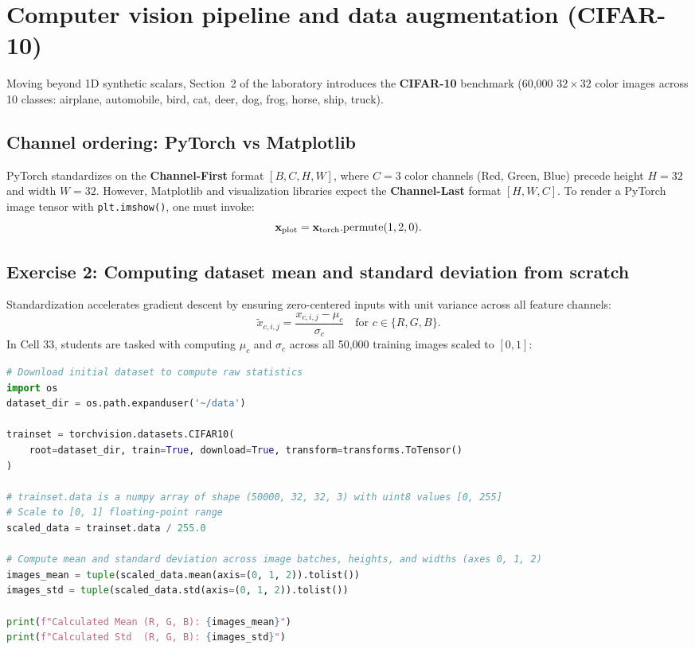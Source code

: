 \documentclass[../labs.tex]{subfiles}
\begin{document}
\section{Computer vision pipeline and data augmentation (CIFAR-10)}

Moving beyond 1D synthetic scalars, Section~2 of the laboratory introduces the \textbf{CIFAR-10} benchmark (60,000 $32 \times 32$ color images across 10 classes: airplane, automobile, bird, cat, deer, dog, frog, horse, ship, truck).

\subsection{Channel ordering: PyTorch vs Matplotlib}
PyTorch standardizes on the \textbf{Channel-First} format $[B, C, H, W]$, where $C = 3$ color channels (Red, Green, Blue) precede height $H = 32$ and width $W = 32$. However, Matplotlib and visualization libraries expect the \textbf{Channel-Last} format $[H, W, C]$. To render a PyTorch image tensor with \texttt{plt.imshow()}, one must invoke:
\begin{equation}
\mathbf{x}_{\text{plot}} = \mathbf{x}_{\text{torch}}.\text{permute}(1, 2, 0).
\end{equation}

\subsection{Exercise 2: Computing dataset mean and standard deviation from scratch}
Standardization accelerates gradient descent by ensuring zero-centered inputs with unit variance across all feature channels:
\begin{equation}
\tilde{x}_{c, i, j} = \frac{x_{c, i, j} - \mu_c}{\sigma_c} \quad \text{for } c \in \{R, G, B\}.
\end{equation}
In Cell 33, students are tasked with computing $\mu_c$ and $\sigma_c$ across all 50,000 training images scaled to $[0, 1]$:

\begin{lstlisting}[language=Python, caption={Verified solution for calculating dataset mean and standard deviation per channel (Cell 33).}, label={lst:lab01_cifar_mean_std}]
# Download initial dataset to compute raw statistics
import os
dataset_dir = os.path.expanduser('~/data')

trainset = torchvision.datasets.CIFAR10(
    root=dataset_dir, train=True, download=True, transform=transforms.ToTensor()
)

# trainset.data is a numpy array of shape (50000, 32, 32, 3) with uint8 values [0, 255]
# Scale to [0, 1] floating-point range
scaled_data = trainset.data / 255.0

# Compute mean and standard deviation across image batches, heights, and widths (axes 0, 1, 2)
images_mean = tuple(scaled_data.mean(axis=(0, 1, 2)).tolist())
images_std = tuple(scaled_data.std(axis=(0, 1, 2)).tolist())

print(f"Calculated Mean (R, G, B): {images_mean}")
print(f"Calculated Std  (R, G, B): {images_std}")
\end{lstlisting}
\end{document}

